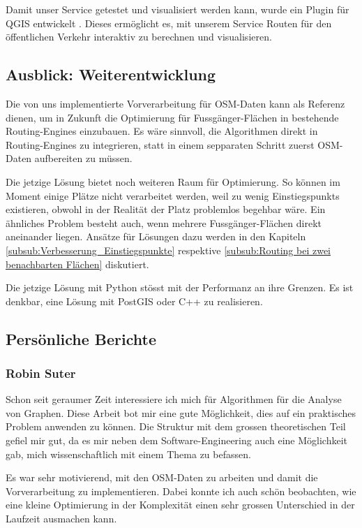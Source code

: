 Damit unser Service getestet und visualisiert werden kann, wurde ein Plugin für QGIS entwickelt \cite{github:PlazaRoute-qgis-plugin}. Dieses ermöglicht es, mit unserem Service Routen für den öffentlichen Verkehr interaktiv zu berechnen und visualisieren.

\subsection{Ausblick: Weiterentwicklung}
\label{sub:Ausblick: Weiterentwicklung}

Die von uns implementierte Vorverarbeitung für \ac{OSM}-Daten kann als Referenz dienen, um in Zukunft die Optimierung für Fussgänger-Flächen in bestehende Routing-Engines einzubauen. Es wäre sinnvoll, die Algorithmen direkt in Routing-Engines zu integrieren, statt in einem sepparaten Schritt zuerst \ac{OSM}-Daten aufbereiten zu müssen.

Die jetzige Lösung bietet noch weiteren Raum für Optimierung. So können im Moment einige Plätze nicht verarbeitet werden, weil zu wenig \glspl{Einstiegspunkt} existieren, obwohl in der Realität der Platz problemlos begehbar wäre. Ein ähnliches Problem besteht auch, wenn mehrere Fussgänger-Flächen direkt aneinander liegen. Ansätze für Lösungen dazu werden in den Kapiteln \ref{subsub:Verbesserung_Einstiegspunkte} respektive \ref{subsub:Routing bei zwei benachbarten Flächen} diskutiert.

Die jetzige Lösung mit Python stösst mit der Performanz an ihre Grenzen. Es ist denkbar, eine Lösung mit PostGIS oder C++ zu realisieren.

\subsection{Persönliche Berichte}
\label{sub:Persönliche Berichte}

\subsubsection{Robin Suter}
\label{Persönliche Berichte:Robin Suter}
Schon seit geraumer Zeit interessiere ich mich für Algorithmen für die Analyse von Graphen. Diese Arbeit bot mir eine gute Möglichkeit, dies auf ein praktisches Problem anwenden zu können. Die Struktur mit dem grossen theoretischen Teil gefiel mir gut, da es mir neben dem Software-Engineering auch eine Möglichkeit gab, mich wissenschaftlich mit einem Thema zu befassen.

Es war sehr motivierend, mit den \ac{OSM}-Daten zu arbeiten und damit die Vorverarbeitung zu implementieren. Dabei konnte ich auch schön beobachten, wie eine kleine Optimierung in der Komplexität einen sehr grossen Unterschied in der Laufzeit ausmachen kann.

